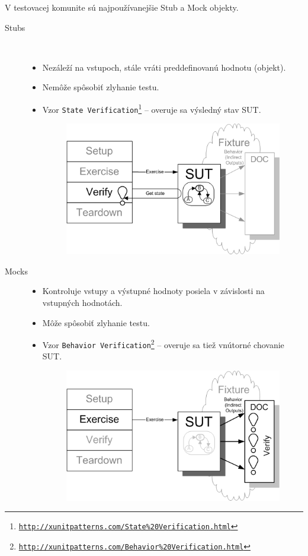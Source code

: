 V testovacej komunite sú najpoužívanejšie Stub a Mock objekty.
\begin{description}
	\item[Stubs]\
		\label{stub}
		\begin{itemize}
			\item Nezáleží na vstupoch, stále vráti preddefinovanú hodnotu (objekt).
			\item Nemôže spôsobiť zlyhanie testu.
			\item Vzor \texttt{State Verification\footnote{\url{http://xunitpatterns.com/State\%20Verification.html}}} -- overuje sa výsledný stav SUT.
				\begin{figure}[H]
					\centering
					\includegraphics[width=0.4\linewidth]{obrazky/state_verification.png}
				\end{figure}
		\end{itemize}
	\item[Mocks]
		\label{mock}
		\begin{itemize}
			\item Kontroluje vstupy a výstupné hodnoty posiela v závislosti na vstupných hodnotách.
			\item Môže spôsobiť zlyhanie testu.
			\item Vzor \texttt{Behavior Verification\footnote{\url{http://xunitpatterns.com/Behavior\%20Verification.html}}} -- overuje sa tiež vnútorné chovanie SUT.
				\begin{figure}[H]
					\centering
					\includegraphics[width=0.4\linewidth]{obrazky/behavior_verification.png}
				\end{figure}
		\end{itemize}
\end{description}
